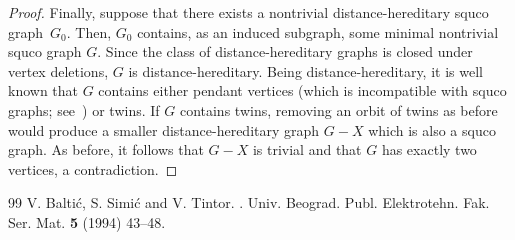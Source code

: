 \documentclass[10pt,a4paper]{amsart}
\theoremstyle{plain}
\begin{document}
\begin{proof}
  Finally, suppose that there exists a nontrivial distance-hereditary squco graph~$G_0$. Then, $G_0$ contains, as an induced subgraph, some minimal nontrivial squco graph $G$. 
Since the class of distance-hereditary graphs is closed under vertex deletions, $G$ is distance-hereditary. 
  Being distance-hereditary, it is well known that $G$
  contains either pendant vertices (which is incompatible with squco graphs; see~\cite{BST94}) or twins. 
  If $G$ contains twins, removing an orbit of twins as before would produce a smaller distance-hereditary graph $G-X$ which is also a squco graph. 
  As before, it follows that $G-X$ is trivial and that $G$ has exactly two vertices, a contradiction.
\end{proof}

\begin{thebibliography}{99}
 V. Balti\'{c}, S. Simi\'{c} and V. Tintor. . \newblock Univ. Beograd. Publ. Elektrotehn. Fak. Ser. Mat. {\bf 5} (1994) 43--48.
\end{thebibliography}
\end{document}

